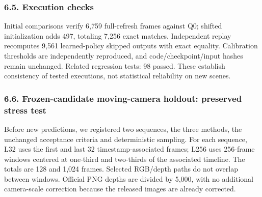 \documentclass[
  10pt,
]{article}
\begin{document}
\subsubsection{6.5. Execution checks}\label{execution-checks}

Initial comparisons verify 6,759 full-refresh frames against Q0; shifted
initialization adds 497, totaling 7,256 exact matches. Independent
replay recomputes 9,561 learned-policy skipped outputs with exact
equality. Calibration thresholds are independently reproduced, and
code/checkpoint/input hashes remain unchanged. Related regression tests:
98 passed. These establish consistency of tested executions, not
statistical reliability on new scenes.

\subsubsection{6.6. Frozen-candidate moving-camera holdout: preserved
stress
test}\label{frozen-candidate-moving-camera-holdout-preserved-stress-test}

Before new predictions, we registered two sequences, the three methods,
the unchanged acceptance criteria and deterministic sampling. For each
sequence, L32 uses the first and last 32 timestamp-associated frames;
L256 uses 256-frame windows centered at one-third and two-thirds of the
associated timeline. The totals are 128 and 1,024 frames. Selected
RGB/depth paths do not overlap between windows. Official PNG depths are
divided by 5,000, with no additional camera-scale correction because the
released images are already corrected.
\end{document}

